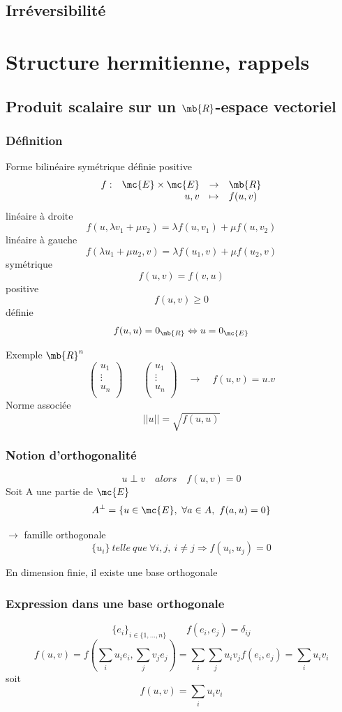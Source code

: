 \subsection{Irréversibilité} %

\section{Structure hermitienne, rappels} %
\subsection{Produit scalaire sur un $\mb{R}$-espace vectoriel} %
\subsubsection{Définition} %
Forme bilinéaire symétrique définie positive
\[
\begin{array}{ c r c l }
 f : & \mc{E}\times\mc{E} & \to & \mb{R} \\
  & u,v & \mapsto & f(u,v) \\
\end{array}
\]
linéaire à droite
\[
f(u,\lambda v_1+\mu v_2)=\lambda f(u,v_1)+\mu f(u,v_2)
\]
linéaire à gauche
\[
f(\lambda u_1+\mu u_2, v)=\lambda f(u_1,v)+\mu f(u_2,v)
\]
symétrique
\[
f(u,v)=f(v,u)
\]
positive
\[
f(u,v)\geqslant 0
\]
définie
\[
f(u,u)=0_\mb{R} \Leftrightarrow u=0_\mc{E}
\]

Exemple $\mb{R}^n$
\[
\left(\begin{array}{ c }
 u_1 \\ \vdots \\ u_n \\
\end{array}\right)
\qquad
\left(\begin{array}{ c }
 u_1 \\ \vdots \\ u_n \\
\end{array}\right)
\quad\to\quad f(u,v)=u.v
\]
Norme associée
\[
||u||=\sqrt{f(u,u)}
\]

\subsubsection{Notion d'orthogonalité} %

\[
u \perp v \quad alors\quad f(u,v)=0
\]
Soit A une partie de $\mc{E}$
\[
A^\perp = \{u\in\mc{E},\ \forall a \in A,\ f(a,u)=0\}
\]

$\to$ famille orthogonale
\[
\{u_i\}\ telle\ que\ \forall i,j,\ i\neq j \Rightarrow f(u_i,u_j)=0
\]

En dimension finie, il existe une base orthogonale
\subsubsection{Expression dans une base orthogonale} %
\[
\{e_i\}_{i\in\{1,...,n\}} \qquad f(e_i,e_j)=\delta_{ij}
\]
\[
f(u,v)=f(\sum_iu_ie_i,\sum_jv_je_j)=\sum_i\sum_ju_iv_jf(e_i,e_j)=\sum_iu_iv_i
\]
soit
\[
\boxed{f(u,v)=\sum_iu_iv_i}
\]
